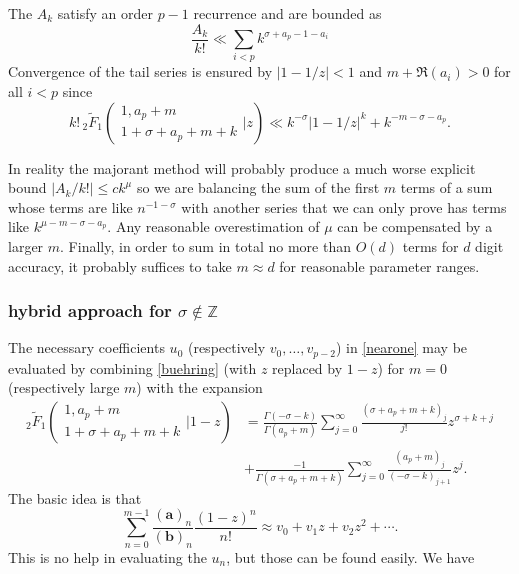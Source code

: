 \documentclass[12pt]{article}
\numberwithin{equation}{section}
\begin{document}
The $A_k$ satisfy an order $p-1$ recurrence and are bounded as
\begin{equation}
\frac{A_k}{k!} \ll \sum_{i<p}k^{\sigma+a_p-1-a_i}
\end{equation}
Convergence of the tail series is ensured by
$|1-1/z|<1$ and $m+\Re(a_i)>0$ for all $i<p$ since
\begin{equation*}
k! \, _2\tilde{F}_1\left( \begin{array}{c} 1,a_p+m \\ 1+\sigma+a_p+m+k \end{array} \Big| z\right) \ll k^{-\sigma} \left|1-1/z\right|^k + k^{-m-\sigma-a_p}\text{.}
\end{equation*}

In reality the majorant method will probably produce a much worse explicit bound $|A_k/k!| \le c k^{\mu}$ so we are balancing the sum of the first $m$ terms of a sum whose terms are like $n^{-1-\sigma}$ with another series that we can only prove has terms like $k^{\mu-m-\sigma-a_p}$. Any reasonable overestimation of $\mu$ can be compensated by a larger $m$. Finally, in order to sum in total no more than $O(d)$ terms for $d$ digit accuracy, it probably suffices to take $m \approx d$ for reasonable parameter ranges.

\subsubsection{hybrid approach for $\sigma \not \in \mathbb{Z}$}
The necessary coefficients $u_0$ (respectively $v_0,\dots,v_{p-2}$) in \eqref{nearone} may be evaluated by combining \eqref{buehring} (with $z$ replaced by $1-z$) for $m=0$ (respectively large $m$) with the expansion
\begin{equation}
\label{2f1nearone}
\begin{aligned}
{}_2\tilde{F}_1\left(\begin{array}{c} 1,a_p+m \\ 1+\sigma+a_p+m+k \end{array} \Big| 1-z\right) &= \frac{\Gamma (-\sigma-k)}{\Gamma (a_p+m)} \sum_{j=0}^{\infty} \frac{(\sigma+a_p+m+k)_j}{j!}z^{\sigma+k+j}\\
&+\frac{-1}{\Gamma
   \left(\sigma+a_p+m+k\right)} \sum_{j=0}^{\infty} \frac{(a_p+m)_j}{(-\sigma-k)_{j+1}} z^j\text{.}
\end{aligned}
\end{equation}
The basic idea is that
\begin{equation}
\label{viapprox}
\sum_{n=0}^{m-1} \frac{(\mathbf a)_n}{(\mathbf b)_n}\frac{(1-z)^n}{n!} \approx v_0 + v_1 z + v_2 z^2 + \cdots\text{.}
\end{equation}
This is no help in evaluating the $u_n$, but those can be found easily. We have
\end{document}
